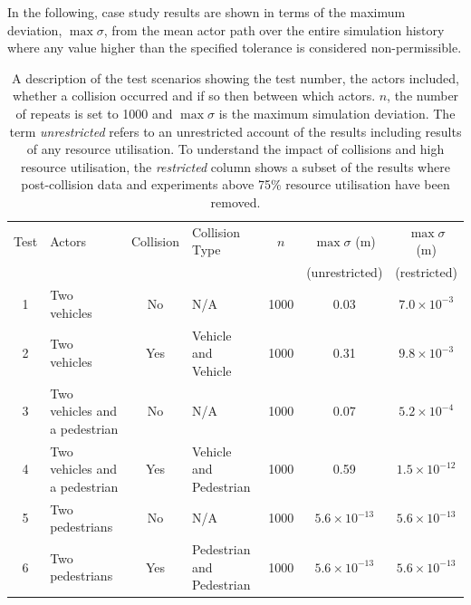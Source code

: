\documentclass[runningheads,twocolumn,a4paper,10pt]{llncs}
\begin{document}
In the following, case study results are shown in terms of the maximum deviation, $\max\sigma$, from the mean actor path over the entire simulation history where any value higher than the specified tolerance is considered non-permissible.
%


\begin{table}[b]
\centering
\begin{tabular}{clclccc}
\toprule
Test & Actors               & Collision    & Collision Type        & $n$  & $\max\sigma$ (m) & $\max\sigma$ (m) \\ 
   &                  &        &               &      & (unrestricted)  & (restricted)  \\ \midrule
1    & Two vehicles                   & No       & N/A               & 1000 & 0.03 & $7.0{\times}10^{-3}$ \\
2    & Two vehicles                   & Yes      & Vehicle and Vehicle     & 1000 & 0.31 & $9.8{\times}10^{-3}$ \\
3    & Two vehicles and a pedestrian  & No       & N/A               & 1000 & 0.07 & $5.2{\times}10^{-4}$ \\
4    & Two vehicles and a pedestrian  & Yes      & Vehicle and Pedestrian    & 1000 & 0.59 & $1.5{\times}10^{-12}$ \\
5    & Two pedestrians                & No       & N/A               & 1000 & $5.6{\times}10^{-13}$ & $5.6{\times}10^{-13}$ \\
6    & Two pedestrians                & Yes      & Pedestrian and Pedestrian & 1000 & $5.6{\times}10^{-13}$ & $5.6{\times}10^{-13}$ \\
\bottomrule
\end{tabular}
\caption{A description of the test scenarios showing the test number, the actors included, whether a collision occurred and if so then between which actors. $n$, the number of repeats is set to 1000 and $\max\sigma$ is the maximum simulation deviation. The term \textit{unrestricted} refers to an unrestricted account of the results including results of any resource utilisation. To understand the impact of collisions and high resource utilisation, the \textit{restricted} column shows a subset of the results where post-collision data and experiments above 75\% resource utilisation have been removed.}
\label{TableOfExperiments}
\end{table}
\end{document}
